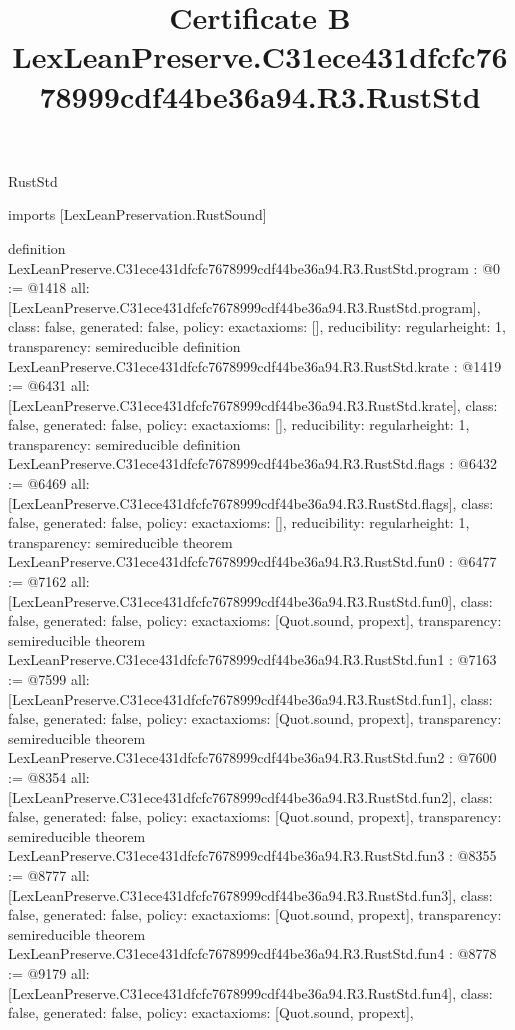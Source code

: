 \begin{lexlean}{RustStd}
\title{Certificate B LexLeanPreserve.C31ece431dfcfc7678999cdf44be36a94.R3.RustStd}
\begin{coremodule}
imports [LexLeanPreservation.RustSound]

definition LexLeanPreserve.C31ece431dfcfc7678999cdf44be36a94.R3.RustStd.program : @0 := @1418 {
  all: [LexLeanPreserve.C31ece431dfcfc7678999cdf44be36a94.R3.RustStd.program],
  class: false,
  generated: false,
  policy: exact{axioms: []},
  reducibility: regular{height: 1},
  transparency: semireducible
}
definition LexLeanPreserve.C31ece431dfcfc7678999cdf44be36a94.R3.RustStd.krate : @1419 := @6431 {
  all: [LexLeanPreserve.C31ece431dfcfc7678999cdf44be36a94.R3.RustStd.krate],
  class: false,
  generated: false,
  policy: exact{axioms: []},
  reducibility: regular{height: 1},
  transparency: semireducible
}
definition LexLeanPreserve.C31ece431dfcfc7678999cdf44be36a94.R3.RustStd.flags : @6432 := @6469 {
  all: [LexLeanPreserve.C31ece431dfcfc7678999cdf44be36a94.R3.RustStd.flags],
  class: false,
  generated: false,
  policy: exact{axioms: []},
  reducibility: regular{height: 1},
  transparency: semireducible
}
theorem LexLeanPreserve.C31ece431dfcfc7678999cdf44be36a94.R3.RustStd.fun0 : @6477 := @7162 {
  all: [LexLeanPreserve.C31ece431dfcfc7678999cdf44be36a94.R3.RustStd.fun0],
  class: false,
  generated: false,
  policy: exact{axioms: [Quot.sound, propext]},
  transparency: semireducible
}
theorem LexLeanPreserve.C31ece431dfcfc7678999cdf44be36a94.R3.RustStd.fun1 : @7163 := @7599 {
  all: [LexLeanPreserve.C31ece431dfcfc7678999cdf44be36a94.R3.RustStd.fun1],
  class: false,
  generated: false,
  policy: exact{axioms: [Quot.sound, propext]},
  transparency: semireducible
}
theorem LexLeanPreserve.C31ece431dfcfc7678999cdf44be36a94.R3.RustStd.fun2 : @7600 := @8354 {
  all: [LexLeanPreserve.C31ece431dfcfc7678999cdf44be36a94.R3.RustStd.fun2],
  class: false,
  generated: false,
  policy: exact{axioms: [Quot.sound, propext]},
  transparency: semireducible
}
theorem LexLeanPreserve.C31ece431dfcfc7678999cdf44be36a94.R3.RustStd.fun3 : @8355 := @8777 {
  all: [LexLeanPreserve.C31ece431dfcfc7678999cdf44be36a94.R3.RustStd.fun3],
  class: false,
  generated: false,
  policy: exact{axioms: [Quot.sound, propext]},
  transparency: semireducible
}
theorem LexLeanPreserve.C31ece431dfcfc7678999cdf44be36a94.R3.RustStd.fun4 : @8778 := @9179 {
  all: [LexLeanPreserve.C31ece431dfcfc7678999cdf44be36a94.R3.RustStd.fun4],
  class: false,
  generated: false,
  policy: exact{axioms: [Quot.sound, propext]},
}
\end{coremodule}
\end{lexlean}
